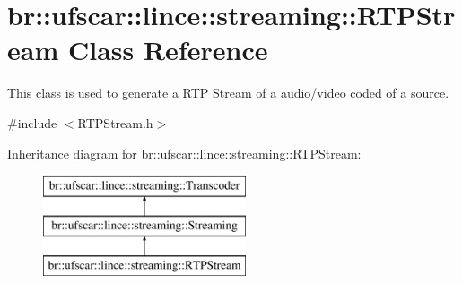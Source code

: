 \hypertarget{classbr_1_1ufscar_1_1lince_1_1streaming_1_1RTPStream}{
\section{br::ufscar::lince::streaming::RTPStream Class Reference}
\label{classbr_1_1ufscar_1_1lince_1_1streaming_1_1RTPStream}
}


This class is used to generate a RTP Stream of a audio/video coded of a source.  




{\ttfamily \#include $<$RTPStream.h$>$}

Inheritance diagram for br::ufscar::lince::streaming::RTPStream:\begin{figure}[H]
\begin{center}
\leavevmode
\includegraphics[height=3cm]{classbr_1_1ufscar_1_1lince_1_1streaming_1_1RTPStream}
\end{center}
\end{figure}
